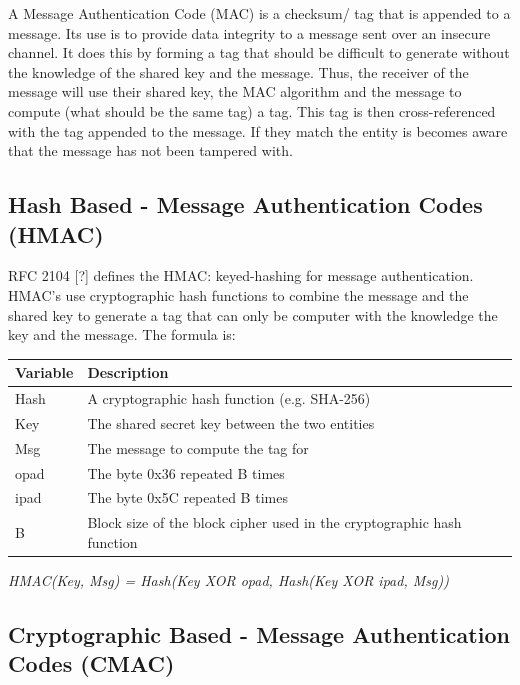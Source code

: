 \documentclass[bsc,frontabs,twoside,singlespacing,parskip,deptreport]{infthesis}     %
\begin{document}
A Message Authentication Code (MAC) is a checksum/ tag that is appended to a message. Its use is to provide data integrity to a message sent over an insecure channel. It does this by forming a tag that should be difficult to generate without the knowledge of the shared key and the message. Thus, the receiver of the message will use their shared key, the MAC algorithm and the message to compute (what should be the same tag) a tag. This tag is then cross-referenced with the tag appended to the message. If they match the entity is becomes aware that the message has not been tampered with.

\subsection{Hash Based - Message Authentication Codes (HMAC)}

RFC 2104 [?] defines the HMAC: keyed-hashing for message authentication. HMAC's use cryptographic hash functions to combine the message and the shared key to generate a tag that can only be computer with the knowledge the key and the message. The formula is:

\begin{table}[H]
\begin{tabular}{|l|l|}
\hline
Variable & Description\\
\hline
Hash & A cryptographic hash function (e.g. SHA-256)\\
\hline
Key & The shared secret key between the two entities\\
\hline
Msg & The message to compute the tag for\\
\hline
opad & The byte 0x36 repeated B times\\
\hline
ipad & The byte 0x5C repeated B times\\
\hline
B & Block size of the block cipher used in the cryptographic hash function\\
\hline
\end{tabular}
\end{table}

\begin{center}
\textit{HMAC(Key, Msg) = Hash(Key XOR opad, Hash(Key XOR ipad, Msg))}
\end{center}


\subsection{Cryptographic Based - Message Authentication Codes (CMAC)}
\end{document}
